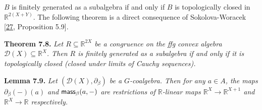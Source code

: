 \documentclass[11pt,a4paper]{amsart}
\begin{document}
\hypertarget{html:S7.SS0.SSS0.P0.SPx4.p2.m10}{}\({B}\) is finitely generated as a subalgebra if and only if %
\hypertarget{html:S7.SS0.SSS0.P0.SPx4.p2.m11}{}\({B}\) is topologically closed in %
\hypertarget{html:S7.SS0.SSS0.P0.SPx4.p2.m12}{}\({\mathbb{R}^{2(X+Y)}}\). The following theorem is a direct consequence of Sokolova-Woracek [\hyperlink{html:bib.bib27}{27}, Proposition 5.9].
\par\medskip
\hypertarget{html:S7.Thmtheorem8}{} \par\noindent\textbf{\textbf{Theorem 7.8}\textbf{.}}\quad  %
\hypertarget{html:S7.Thmtheorem8.p1}{} \emph{Let %
\hypertarget{html:S7.Thmtheorem8.p1.m1}{}\({R\subseteq\mathbb{R}^{2X}}\) be a congruence on the ffg convex algebra %
\hypertarget{html:S7.Thmtheorem8.p1.m2}{}\({{\mathcal{D}}(X)\subseteq\mathbb{R}^{X}}\). Then %
\hypertarget{html:S7.Thmtheorem8.p1.m3}{}\({R}\) is finitely generated as a subalgebra if and only if it is topologically closed (closed under limits of Cauchy sequences).}
\par\medskip
\hypertarget{html:S7.Thmtheorem9}{} \par\noindent\textbf{\textbf{Lemma 7.9}\textbf{.}}\quad  %
\hypertarget{html:S7.Thmtheorem9.p1}{} \emph{Let %
\hypertarget{html:S7.Thmtheorem9.p1.m1}{}\({({\mathcal{D}}(X),\partial_{\beta})}\) be a %
\hypertarget{html:S7.Thmtheorem9.p1.m2}{}\({G}\)-coalgebra. Then for any %
\hypertarget{html:S7.Thmtheorem9.p1.m3}{}\({a\in A}\), the maps %
\hypertarget{html:S7.Thmtheorem9.p1.m4}{}\({\partial_{\beta}(-)(a)}\) and %
\hypertarget{html:S7.Thmtheorem9.p1.m5}{}\({\mbox{\sf mass}_{\beta}(a,-)}\) are restrictions of %
\hypertarget{html:S7.Thmtheorem9.p1.m6}{}\({\mathbb{R}}\)-linear maps %
\hypertarget{html:S7.Thmtheorem9.p1.m7}{}\({\mathbb{R}^{X}\to\mathbb{R}^{X+1}}\) and %
\hypertarget{html:S7.Thmtheorem9.p1.m8}{}\({\mathbb{R}^{X}\to\mathbb{R}}\) respectively.}
\par\medskip
\end{document}
